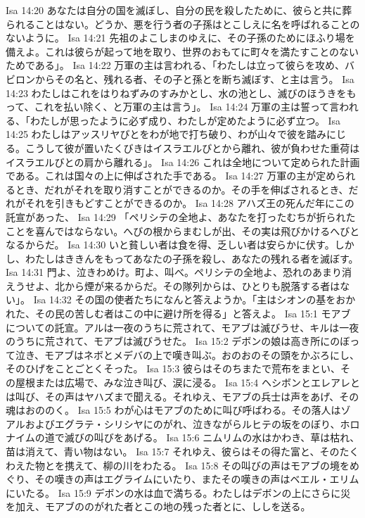 Isa 14:20  あなたは自分の国を滅ぼし、自分の民を殺したために、彼らと共に葬られることはない。どうか、悪を行う者の子孫はとこしえに名を呼ばれることのないように。
Isa 14:21  先祖のよこしまのゆえに、その子孫のためにほふり場を備えよ。これは彼らが起って地を取り、世界のおもてに町々を満たすことのないためである」。
Isa 14:22  万軍の主は言われる、「わたしは立って彼らを攻め、バビロンからその名と、残れる者、その子と孫とを断ち滅ぼす、と主は言う。
Isa 14:23  わたしはこれをはりねずみのすみかとし、水の池とし、滅びのほうきをもって、これを払い除く、と万軍の主は言う」。
Isa 14:24  万軍の主は誓って言われる、「わたしが思ったように必ず成り、わたしが定めたように必ず立つ。
Isa 14:25  わたしはアッスリヤびとをわが地で打ち破り、わが山々で彼を踏みにじる。こうして彼が置いたくびきはイスラエルびとから離れ、彼が負わせた重荷はイスラエルびとの肩から離れる」。
Isa 14:26  これは全地について定められた計画である。これは国々の上に伸ばされた手である。
Isa 14:27  万軍の主が定められるとき、だれがそれを取り消すことができるのか。その手を伸ばされるとき、だれがそれを引きもどすことができるのか。
Isa 14:28  アハズ王の死んだ年にこの託宣があった、
Isa 14:29  「ペリシテの全地よ、あなたを打ったむちが折られたことを喜んではならない。へびの根からまむしが出、その実は飛びかけるへびとなるからだ。
Isa 14:30  いと貧しい者は食を得、乏しい者は安らかに伏す。しかし、わたしはききんをもってあなたの子孫を殺し、あなたの残れる者を滅ぼす。
Isa 14:31  門よ、泣きわめけ。町よ、叫べ。ペリシテの全地よ、恐れのあまり消えうせよ、北から煙が来るからだ。その隊列からは、ひとりも脱落する者はない」。
Isa 14:32  その国の使者たちになんと答えようか。「主はシオンの基をおかれた、その民の苦しむ者はこの中に避け所を得る」と答えよ。
Isa 15:1  モアブについての託宣。アルは一夜のうちに荒されて、モアブは滅びうせ、キルは一夜のうちに荒されて、モアブは滅びうせた。
Isa 15:2  デボンの娘は高き所にのぼって泣き、モアブはネボとメデバの上で嘆き叫ぶ。おのおのその頭をかぶろにし、そのひげをことごとくそった。
Isa 15:3  彼らはそのちまたで荒布をまとい、その屋根または広場で、みな泣き叫び、涙に浸る。
Isa 15:4  ヘシボンとエレアレとは叫び、その声はヤハズまで聞える。それゆえ、モアブの兵士は声をあげ、その魂はおののく。
Isa 15:5  わが心はモアブのために叫び呼ばわる。その落人はゾアルおよびエグラテ・シリシヤにのがれ、泣きながらルヒテの坂をのぼり、ホロナイムの道で滅びの叫びをあげる。
Isa 15:6  ニムリムの水はかわき、草は枯れ、苗は消えて、青い物はない。
Isa 15:7  それゆえ、彼らはその得た富と、そのたくわえた物とを携えて、柳の川をわたる。
Isa 15:8  その叫びの声はモアブの境をめぐり、その嘆きの声はエグライムにいたり、またその嘆きの声はベエル・エリムにいたる。
Isa 15:9  デボンの水は血で満ちる。わたしはデボンの上にさらに災を加え、モアブののがれた者とこの地の残った者とに、ししを送る。
